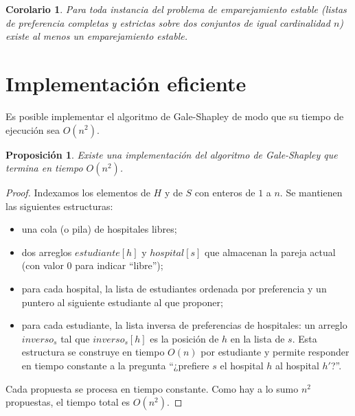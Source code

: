 \documentclass[12pt, spanish, oneside, openany]{book}
\theoremstyle{uprightplain}
\newtheorem{proposicion}[teorema]{Proposición}
\newtheorem{corolario}[teorema]{Corolario}
\theoremstyle{definition}
\theoremstyle{remark}
\theoremstyle{definition}
\begin{document}
\begin{corolario}
Para toda instancia del problema de emparejamiento estable (listas de preferencia completas y estrictas sobre dos conjuntos de igual cardinalidad $n$) existe al menos un emparejamiento estable.
\end{corolario}

\section{Implementación eficiente}

Es posible implementar el algoritmo de Gale-Shapley de modo que su tiempo de ejecución sea $O(n^2)$.

\begin{proposicion}
\label{prop:implementacion}
Existe una implementación del algoritmo de Gale-Shapley que termina en tiempo $O(n^2)$.
\end{proposicion}
\begin{proof}
Indexamos los elementos de $H$ y de $S$ con enteros de $1$ a $n$. Se mantienen las siguientes estructuras:
\begin{itemize}
    \item una cola (o pila) de hospitales libres;
    \item dos arreglos $\mathit{estudiante}[h]$ y $\mathit{hospital}[s]$ que almacenan la pareja actual (con valor $0$ para indicar ``libre'');
    \item para cada hospital, la lista de estudiantes ordenada por preferencia y un puntero al siguiente estudiante al que proponer;
    \item para cada estudiante, la lista inversa de preferencias de hospitales: un arreglo $\mathit{inverso}_s$ tal que $\mathit{inverso}_s[h]$ es la posición de $h$ en la lista de $s$. Esta estructura se construye en tiempo $O(n)$ por estudiante y permite responder en tiempo constante a la pregunta ``¿prefiere $s$ el hospital $h$ al hospital $h'$?''.
\end{itemize}
Cada propuesta se procesa en tiempo constante. Como hay a lo sumo $n^2$ propuestas, el tiempo total es $O(n^2)$.
\end{proof}
\end{document}
